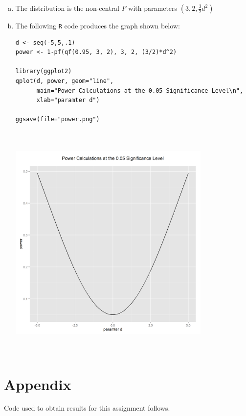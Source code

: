 \documentclass[paper=a4, fontsize=11pt]{scrartcl} %
\begin{document}
\vspace{5mm}
\begin{enumerate}[(a)]

\item The distribution is the non-central $F$ with parameters $(3, 2, \frac{3}{2} d^2)$

\item The following \texttt{R} code produces the graph shown below:
\begin{lstlisting}[basicstyle=\ttfamily\small\bfseries]
d <- seq(-5,5,.1)
power <- 1-pf(qf(0.95, 3, 2), 3, 2, (3/2)*d^2)

library(ggplot2)
qplot(d, power, geom="line", 
      main="Power Calculations at the 0.05 Significance Level\n",
      xlab="paramter d")

ggsave(file="power.png")
\end{lstlisting}

\begin{center}
\includegraphics[width=10cm, height=12cm, width= 12cm]{power}
\end{center} 

\end{enumerate}


\pagebreak
\section*{Appendix}

Code used to obtain results for this assignment follows.\\
\end{document}
